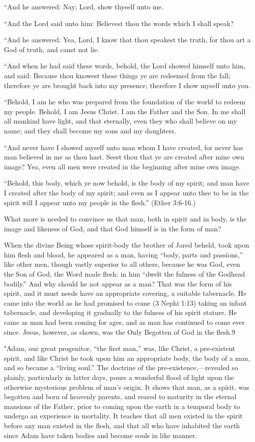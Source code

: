 ``And he answered: Nay; Lord, show thyself unto me.

``And the Lord said unto him: Believest thou the words which I shall speak?

``And he answered: Yea, Lord, I know that thou speakest the truth, for thou art a God of truth,
and canst not lie.

``And when he had said these words, behold, the Lord showed himself unto him, and said:
Because thou knowest these things ye are redeemed from the fall; therefore ye are brought
back into my presence; therefore I show myself unto you.

``Behold, I am he who was prepared from the foundation of the world to redeem my people.
Behold, I am Jesus Christ. I am the Father and the Son. In me shall all mankind have light,
and that eternally, even they who shall believe on my name; and they shall become my sons
and my daughters.

``And never have I showed myself unto man whom I have created, for never has man
believed in me as thou hast. Seest thou that ye are created after mine own image? Yea, even
all men were created in the beginning after mine own image.

``Behold, this body, which ye now behold, is the body of my spirit; and man have I created
after the body of my spirit; and even as I appear unto thee to be in the spirit will I appear unto
my people in the flesh.'' (Ether 3:6-16.)

What more is needed to convince us that man, both in spirit and in body, is the image and
likeness of God, and that God himself is in the form of man?

When the divine Being whose spirit-body the brother of Jared beheld, took upon him flesh
and blood, he appeared as a man, having ``body, parts and passions,'' like other men, though
vastly superior to all others, because he was God, even the Son of God, the Word made flesh:
in him ``dwelt the fulness of the Godhead bodily.'' And why should he not appear as a man?
That was the form of his spirit, and it must needs have an appropriate covering, a suitable
tabernacle. He came into the world as he had promised to come (3 Nephi 1:13) taking an
infant tabernacle, and developing it gradually to the fulness of his spirit stature. He came as
man had been coming for ages, and as man has continued to come ever since. Jesus,
however, as shown, was the Only Begotten of God in the flesh.9

"Adam, our great progenitor, ``the first man,'' was, like Christ, a pre-existent spirit, and like
Christ he took upon him an appropriate body, the body of a man, and so became a ``living
soul.'' The doctrine of the pre-existence,—revealed so plainly, particularly in latter days,
pours a wonderful flood of light upon the otherwise mysterious problem of man's origin. It
shows that man, as a spirit, was begotten and born of heavenly parents, and reared to
maturity in the eternal mansions of the Father, prior to coming upon the earth in a temporal
body to undergo an experience in mortality. It teaches that all men existed in the spirit before
any man existed in the flesh, and that all who have inhabited the earth since Adam have taken
bodies and become souls in like manner.


